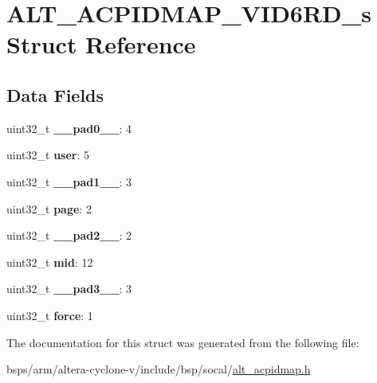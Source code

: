 \hypertarget{structALT__ACPIDMAP__VID6RD__s}{}\section{A\+L\+T\+\_\+\+A\+C\+P\+I\+D\+M\+A\+P\+\_\+\+V\+I\+D6\+R\+D\+\_\+s Struct Reference}
\label{structALT__ACPIDMAP__VID6RD__s}
\subsection*{Data Fields}
\begin{DoxyCompactItemize}
\item 
\mbox{\label{structALT__ACPIDMAP__VID6RD__s_a6a02e89b285dbeef88cf9296bf9890c3}} 
uint32\+\_\+t {\bfseries \+\_\+\+\_\+pad0\+\_\+\+\_\+}\+: 4
\item 
\mbox{\label{structALT__ACPIDMAP__VID6RD__s_a801a8ddde30868c1b4a4790b79d97941}} 
uint32\+\_\+t {\bfseries user}\+: 5
\item 
\mbox{\label{structALT__ACPIDMAP__VID6RD__s_a6d2e2aa35096f2b431d418e55836431f}} 
uint32\+\_\+t {\bfseries \+\_\+\+\_\+pad1\+\_\+\+\_\+}\+: 3
\item 
\mbox{\label{structALT__ACPIDMAP__VID6RD__s_a82d90ea7742263a5787419771c3b4df9}} 
uint32\+\_\+t {\bfseries page}\+: 2
\item 
\mbox{\label{structALT__ACPIDMAP__VID6RD__s_ae29db15c2860ab18b8e910868684b538}} 
uint32\+\_\+t {\bfseries \+\_\+\+\_\+pad2\+\_\+\+\_\+}\+: 2
\item 
\mbox{\label{structALT__ACPIDMAP__VID6RD__s_a56a7c30d015c757b563b01908907d60e}} 
uint32\+\_\+t {\bfseries mid}\+: 12
\item 
\mbox{\label{structALT__ACPIDMAP__VID6RD__s_a7953bba5f8314b964d7c28a9bf4f408a}} 
uint32\+\_\+t {\bfseries \+\_\+\+\_\+pad3\+\_\+\+\_\+}\+: 3
\item 
\mbox{\label{structALT__ACPIDMAP__VID6RD__s_a7d57dcc2bebd5f8fb96c9242c2cc1c9b}} 
uint32\+\_\+t {\bfseries force}\+: 1
\end{DoxyCompactItemize}


The documentation for this struct was generated from the following file\+:\begin{DoxyCompactItemize}
\item 
bsps/arm/altera-\/cyclone-\/v/include/bsp/socal/\mbox{\hyperlink{alt__acpidmap_8h}{alt\+\_\+acpidmap.\+h}}\end{DoxyCompactItemize}
